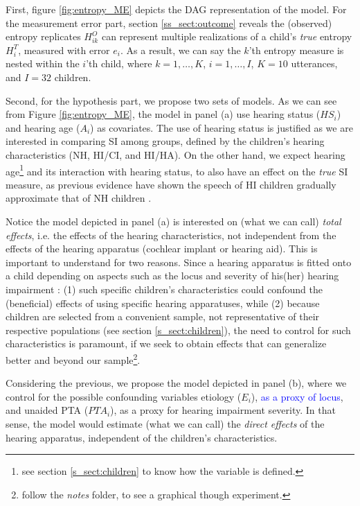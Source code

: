 First, figure \ref{fig:entropy_ME} depicts the DAG representation of the model. For the measurement error part, section \ref{ss_sect:outcome} reveals the (observed) entropy replicates $H^{O}_{ik}$ can represent multiple realizations of a child's \textit{true} entropy $H^{T}_{i}$, measured with error $e_i$. As a result, we can say the $k$'th entropy measure is nested within the $i$'th child, where $k=1, \dots, K$, $i=1, \dots, I$, $K = 10$ utterances, and $I = 32$ children.

Second, for the hypothesis part, we propose two sets of models. As we can see from Figure \ref{fig:entropy_ME}, the model in panel (a) use hearing status ($HS_{i}$) and hearing age ($A_{i}$) as covariates. The use of hearing status is justified as we are interested in comparing SI among groups, defined by the children's hearing characteristics (NH, HI/CI, and HI/HA). On the other hand, we expect hearing age\footnote{see section \ref{s_sect:children} to know how the variable is defined.} and its interaction with hearing status, to also have an effect on the \textit{true} SI measure, as previous evidence have shown the speech of HI children gradually approximate that of NH children \citep{Boonen_et_al_2019}.

Notice the model depicted in panel (a) is interested on (what we can call) \textit{total effects}, i.e. the effects of the hearing characteristics, not independent from the effects of the hearing apparatus (cochlear implant or hearing aid). This is important to understand for two reasons. Since a hearing apparatus is fitted onto a child depending on aspects such as the locus and severity of his(her) hearing impairment \citep{Korver_et_al_2017}: (1) such specific children's characteristics could confound the (beneficial) effects of using specific hearing apparatuses, while (2) because children are selected from a convenient sample, not representative of their respective populations (see section \ref{s_sect:children}), the need to control for such characteristics is paramount, if we seek to obtain effects that can generalize better and beyond our sample\footnote{follow the \textit{notes} folder, to see a graphical though experiment.}.

Considering the previous, we propose the model depicted in panel (b), where we control for the possible confounding variables etiology ($E_{i}$), \textcolor{blue}{as a proxy of locus}, and unaided PTA ($PTA_{i}$), as a proxy for hearing impairment severity. In that sense, the model would estimate (what we can call) the \textit{direct effects} of the hearing apparatus, independent of the children's characteristics.

